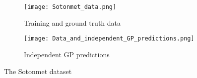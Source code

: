 \begin{figure}[pht]
    \centering
    \begin{subfigure}{0.45\textwidth}
        \centering
        \texttt{[image: Sotonmet\_data.png]}
        \caption{Training and ground truth data}
        \label{fig:data}
    \end{subfigure}
    \begin{subfigure}{0.45\textwidth}
        \centering
        \texttt{[image: Data\_and\_independent\_GP\_predictions.png]}
        \caption{Independent GP predictions}
        \label{fig:ind_pres}
    \end{subfigure}
    \caption{The Sotonmet dataset}
    \label{fig:sotonmet}
\end{figure}

